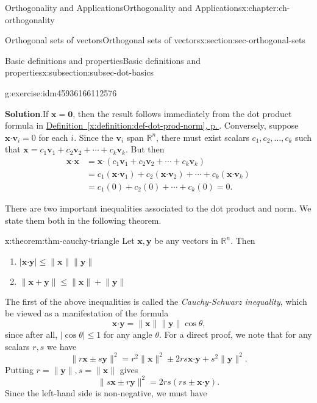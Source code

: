\documentclass[oneside,10pt,]{book}
\newcommand{\blocktitlefont}{\relax}
\newcommand{\xreffont}{\relax}
\numberwithin{equation}{section}
\newcommand{\R}{\mathbb{R}}
\newcommand{\dotp}{\!\boldsymbol{\cdot}\!}
\newcommand{\len}[1]{\lVert #1\rVert}
\newcommand{\vv}{\mathbf{v}}
\newcommand{\xx}{\mathbf{x}}
\newcommand{\yy}{\mathbf{y}}
\newcommand{\amp}{&}
\begin{document}
\begin{chapterptx}{Orthogonality and Applications}{}{Orthogonality and Applications}{}{}{x:chapter:ch-orthogonality}
\begin{sectionptx}{Orthogonal sets of vectors}{}{Orthogonal sets of vectors}{}{}{x:section:sec-orthogonal-sets}
\begin{subsectionptx}{Basic definitions and properties}{}{Basic definitions and properties}{}{}{x:subsection:subsec-dot-basics}
\begin{inlineexercise}{}{g:exercise:idm45936166112576}
\par\smallskip%
\noindent\textbf{\blocktitlefont Solution}.\label{g:solution:idm45936166110272}{}\hypertarget{g:solution:idm45936166110272}{}\quad{}If \(\xx=\mathbf{0}\), then the result follows immediately from the dot product formula in \hyperref[x:definition:def-dot-prod-norm]{Definition~{\xreffont\ref{x:definition:def-dot-prod-norm}}, p.\,\pageref{x:definition:def-dot-prod-norm}}. Conversely, suppose \(\xx\dotp \vv_i=0\) for each \(i\). Since the \(\vv_i\) span \(\R^n\), there must exist scalars \(c_1,c_2,\ldots, c_k\) such that \(\xx=c_1\vv_1+c_2\vv_2+\cdots+c_k\vv_k\). But then%
\begin{align*}
\xx\dotp\xx \amp = \xx\dotp (c_1\vv_1+c_2\vv_2+\cdots+c_k\vv_k) \\
\amp = c_1(\xx\dotp \vv_1)+ c_2(\xx\dotp \vv_2)+\cdots +c_k(\xx\dotp \vv_k)\\
\amp = c_1(0)+c_2(0)+\cdots + c_k(0)=0\text{.}
\end{align*}
%
\end{inlineexercise}%
There are two important inequalities associated to the dot product and norm. We state them both in the following theorem.%
\begin{theorem}{}{}{x:theorem:thm-cauchy-triangle}%
Let \(\xx,\yy\) be any vectors in \(\R^n\). Then%
\begin{enumerate}
\item{}\(\displaystyle \lvert \xx\dotp \yy\rvert \leq \len{\xx}\len{\yy}\)%
\item{}\(\displaystyle \len{\xx+\yy}\leq \len{\xx}+\len{\yy}\)%
\end{enumerate}
%
\end{theorem}
The first of the above inequalities is called the \emph{Cauchy-Schwarz inequality}, which be viewed as a manifestation of the formula%
\begin{equation*}
\xx\dotp \yy = \len{\xx}\len{\yy}\cos\theta\text{,}
\end{equation*}
since after all, \(\lvert \cos\theta\rvert\leq 1\) for any angle \(\theta\). For a direct proof, we note that for any scalars \(r,s\) we have%
\begin{equation*}
\len{r\xx\pm s\yy}^2 = r^2\len{\xx}^2\pm 2rs\xx\dotp\yy+s^2\len{\yy}^2\text{.}
\end{equation*}
Putting \(r=\len{\yy}, s=\len{\xx}\) gives%
\begin{equation*}
\len{s\xx\pm r\yy}^2 = 2rs(rs\pm\xx\dotp\yy)\text{.}
\end{equation*}
Since the left-hand side is non-negative, we must have%

\end{subsectionptx}
\end{sectionptx}
\end{chapterptx}
\end{document}
